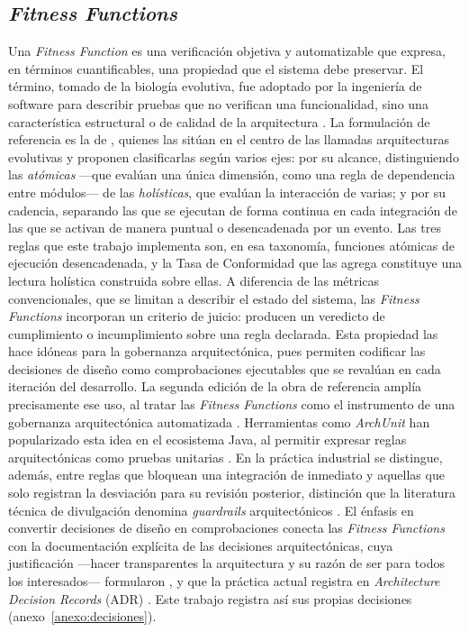 \subsection{\textit{Fitness Functions}}
Una \textit{Fitness Function} es una verificación objetiva y automatizable que expresa, en términos cuantificables, una propiedad que el sistema debe preservar. El término, tomado de la biología evolutiva, fue adoptado por la ingeniería de software para describir pruebas que no verifican una funcionalidad, sino una característica estructural o de calidad de la arquitectura \citep{PaulWang2019}. La formulación de referencia es la de \citet{FordParsonsKua2017}, quienes las sitúan en el centro de las llamadas arquitecturas evolutivas y proponen clasificarlas según varios ejes: por su alcance, distinguiendo las \textit{atómicas} —que evalúan una única dimensión, como una regla de dependencia entre módulos— de las \textit{holísticas}, que evalúan la interacción de varias; y por su cadencia, separando las que se ejecutan de forma continua en cada integración de las que se activan de manera puntual o desencadenada por un evento. Las tres reglas que este trabajo implementa son, en esa taxonomía, funciones atómicas de ejecución desencadenada, y la Tasa de Conformidad que las agrega constituye una lectura holística construida sobre ellas. A diferencia de las métricas convencionales, que se limitan a describir el estado del sistema, las \textit{Fitness Functions} incorporan un criterio de juicio: producen un veredicto de cumplimiento o incumplimiento sobre una regla declarada. Esta propiedad las hace idóneas para la gobernanza arquitectónica, pues permiten codificar las decisiones de diseño como comprobaciones ejecutables que se revalúan en cada iteración del desarrollo. La segunda edición de la obra de referencia amplía precisamente ese uso, al tratar las \textit{Fitness Functions} como el instrumento de una gobernanza arquitectónica automatizada \citep{Ford2022}. Herramientas como \textit{ArchUnit} han popularizado esta idea en el ecosistema Java, al permitir expresar reglas arquitectónicas como pruebas unitarias \citep{ArchUnit}. En la práctica industrial se distingue, además, entre reglas que bloquean una integración de inmediato y aquellas que solo registran la desviación para su revisión posterior, distinción que la literatura técnica de divulgación denomina \textit{guardrails} arquitectónicos \citep{StefanoRossiniMedium}. El énfasis en convertir decisiones de diseño en comprobaciones conecta las \textit{Fitness Functions} con la documentación explícita de las decisiones arquitectónicas, cuya justificación ---hacer transparentes la arquitectura y su razón de ser para todos los interesados--- formularon \citet{TyreeAkerman2005}, y que la práctica actual registra en \textit{Architecture Decision Records} (ADR) \citep{ADR}. Este trabajo registra así sus propias decisiones (anexo~\ref{anexo:decisiones}).


